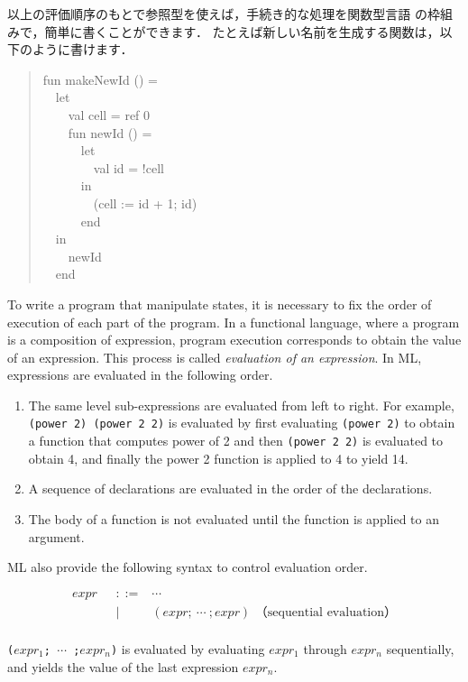\documentclass{jbook}
\newcommand{\vbar}{\mbox{\ $|$\ }}
\newcommand{\myem}{\mbox{\ \ }}
\begin{document}
	以上の評価順序のもとで参照型を使えば，手続き的な処理を関数型言語
の枠組みで，簡単に書くことができます．
	たとえば新しい名前を生成する関数は，以下のように書けます．
\begin{tt}
\begin{quote}
fun makeNewId () =\\
\myem let\\
\myem\myem val cell = ref 0\\
\myem\myem fun newId () =\\
\myem\myem\myem let\\
\myem\myem\myem\myem val id = !cell\\
\myem\myem\myem in\\
\myem\myem\myem\myem (cell := id + 1; id)\\
\myem\myem\myem end\\
\myem in\\
\myem\myem newId\\
\myem end
\end{quote}
\end{tt}
\else%
	To write a program that manipulate states, it is necessary to
fix the order of execution of each part of the program.
	In a functional language, where a program is a composition of
expression, program execution corresponds to obtain the value of an
expression.
	This process is called {\em evaluation of an expression}.
	In ML, expressions are evaluated in the following order.
\begin{enumerate}
\item The same level sub-expressions are evaluated from left to right. 
	For example, {\tt (power 2) (power 2 2)} is evaluated by
first evaluating {\tt (power 2)} to obtain a function that computes
power of 2 and then {\tt (power 2 2)} is evaluated to obtain 4, and
finally the power 2 function is applied to 4 to yield 
14.
\item A sequence of declarations are evaluated in the order of the
declarations.
\item The body of a function is not evaluated until the function is
applied to an argument.
\end{enumerate}
	ML also provide the following syntax to control evaluation order.
\begin{tt}
\begin{eqnarray*}
expr &\mbox{\ \ }::=& \cdots\\
     &\vbar& (expr;{\ }\cdots{\ };expr)   \mbox{\ \ \ \ （sequential evaluation）} \\
\end{eqnarray*}
\end{tt}
	{\tt ($expr_1$;{\ }$\cdots${\ };$expr_n$)} is evaluated by 
evaluating $expr_1$ through $expr_n$ sequentially, and yields the value
of the last expression $expr_n$.
\end{document}
